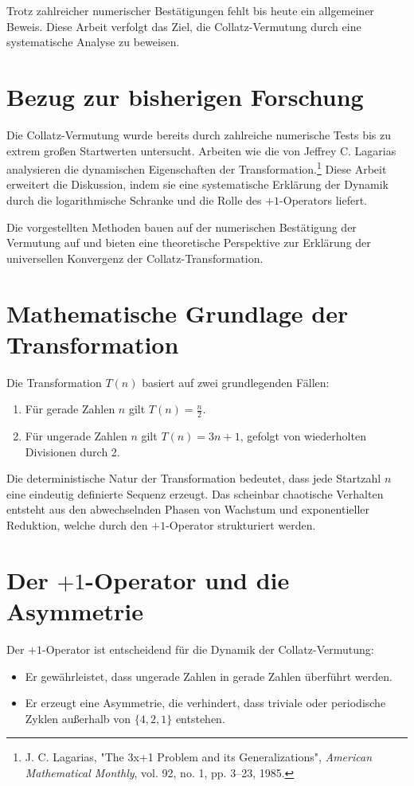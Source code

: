 \documentclass[a4paper,12pt]{article}
\begin{document}
Trotz zahlreicher numerischer Bestätigungen fehlt bis heute ein allgemeiner Beweis. Diese Arbeit verfolgt das Ziel, die Collatz-Vermutung durch eine systematische Analyse zu beweisen.

\section{Bezug zur bisherigen Forschung}
Die Collatz-Vermutung wurde bereits durch zahlreiche numerische Tests bis zu extrem großen Startwerten untersucht. Arbeiten wie die von Jeffrey C. Lagarias analysieren die dynamischen Eigenschaften der Transformation.\footnote{J. C. Lagarias, "The 3x+1 Problem and its Generalizations", \textit{American Mathematical Monthly}, vol. 92, no. 1, pp. 3–23, 1985.} Diese Arbeit erweitert die Diskussion, indem sie eine systematische Erklärung der Dynamik durch die logarithmische Schranke und die Rolle des \(+1\)-Operators liefert.

Die vorgestellten Methoden bauen auf der numerischen Bestätigung der Vermutung auf und bieten eine theoretische Perspektive zur Erklärung der universellen Konvergenz der Collatz-Transformation.

\section{Mathematische Grundlage der Transformation}
Die Transformation \( T(n) \) basiert auf zwei grundlegenden Fällen:
\begin{enumerate}
    \item Für gerade Zahlen \( n \) gilt \( T(n) = \frac{n}{2} \).
    \item Für ungerade Zahlen \( n \) gilt \( T(n) = 3n + 1 \), gefolgt von wiederholten Divisionen durch 2.
\end{enumerate}

Die deterministische Natur der Transformation bedeutet, dass jede Startzahl \( n \) eine eindeutig definierte Sequenz erzeugt. Das scheinbar chaotische Verhalten entsteht aus den abwechselnden Phasen von Wachstum und exponentieller Reduktion, welche durch den \(+1\)-Operator strukturiert werden.

\section{Der \(+1\)-Operator und die Asymmetrie}
Der \(+1\)-Operator ist entscheidend für die Dynamik der Collatz-Vermutung:
\begin{itemize}
    \item Er gewährleistet, dass ungerade Zahlen in gerade Zahlen überführt werden.
    \item Er erzeugt eine Asymmetrie, die verhindert, dass triviale oder periodische Zyklen außerhalb von \( \{4, 2, 1\} \) entstehen.
\end{itemize}
\end{document}
